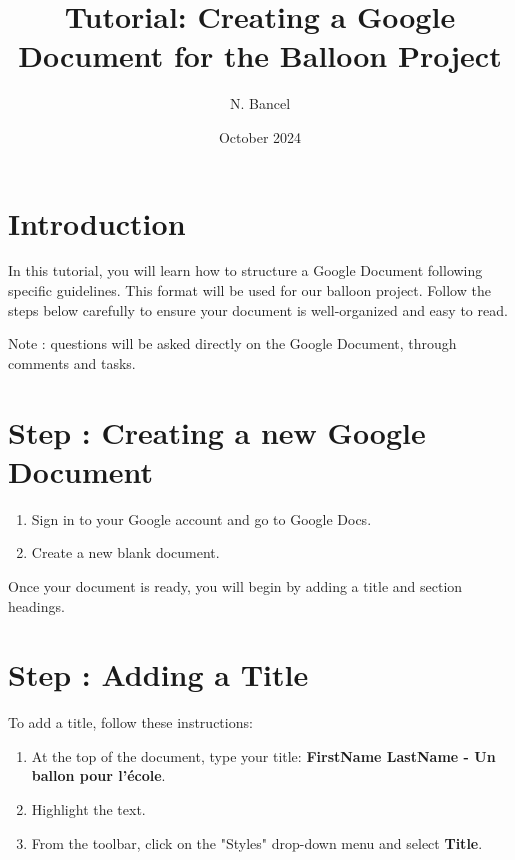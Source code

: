 \documentclass{article}
\title{Tutorial: Creating a Google Document for the Balloon Project}
\author{N. Bancel}
\date{October 2024}
\begin{document}
\maketitle

\section*{Introduction}

In this tutorial, you will learn how to structure a Google Document following specific guidelines. This format will be used for our balloon project. Follow the steps below carefully to ensure your document is well-organized and easy to read.

\vspace{1em}

Note : questions will be asked directly on the Google Document, through comments and tasks.

\section{Step : Creating a new Google Document}

\begin{tcolorbox}[colback=blue!10!white, colframe=blue!75!black, title=Instructions]
  \begin{enumerate}
  \item Sign in to your Google account and go to Google Docs.  
  \item Create a new blank document.
\end{enumerate}
\end{tcolorbox}

Once your document is ready, you will begin by adding a title and section headings.

\section{Step : Adding a Title}

To add a title, follow these instructions:

\begin{tcolorbox}[colback=green!10!white, colframe=green!75!black, title=Instructions]
  \begin{enumerate}
    \item At the top of the document, type your title: \textbf{FirstName LastName - Un ballon pour l'école}.  
    \item Highlight the text. 
    \item From the toolbar, click on the "Styles" drop-down menu and select \textbf{Title}.   
  \end{enumerate}
\end{tcolorbox}
\end{document}
